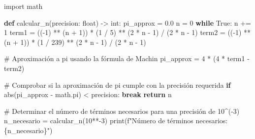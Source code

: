 \documentclass[
  letterpaper,
  DIV=11,
  numbers=noendperiod]{scrartcl}
\newenvironment{Shaded}{\begin{snugshade}}{\end{snugshade}}
\newcommand{\BuiltInTok}[1]{\textcolor[rgb]{0.00,0.23,0.31}{#1}}
\newcommand{\CommentTok}[1]{\textcolor[rgb]{0.37,0.37,0.37}{#1}}
\newcommand{\ControlFlowTok}[1]{\textcolor[rgb]{0.00,0.23,0.31}{\textbf{#1}}}
\newcommand{\DecValTok}[1]{\textcolor[rgb]{0.68,0.00,0.00}{#1}}
\newcommand{\FloatTok}[1]{\textcolor[rgb]{0.68,0.00,0.00}{#1}}
\newcommand{\ImportTok}[1]{\textcolor[rgb]{0.00,0.46,0.62}{#1}}
\newcommand{\KeywordTok}[1]{\textcolor[rgb]{0.00,0.23,0.31}{\textbf{#1}}}
\newcommand{\NormalTok}[1]{\textcolor[rgb]{0.00,0.23,0.31}{#1}}
\newcommand{\OperatorTok}[1]{\textcolor[rgb]{0.37,0.37,0.37}{#1}}
\newcommand{\SpecialCharTok}[1]{\textcolor[rgb]{0.37,0.37,0.37}{#1}}
\newcommand{\SpecialStringTok}[1]{\textcolor[rgb]{0.13,0.47,0.30}{#1}}
\newcommand{\VariableTok}[1]{\textcolor[rgb]{0.07,0.07,0.07}{#1}}
\begin{document}
\begin{Shaded}
\begin{Highlighting}[]
\ImportTok{import}\NormalTok{ math}

\KeywordTok{def}\NormalTok{ calcular\_n(precision: }\BuiltInTok{float}\NormalTok{) }\OperatorTok{{-}\textgreater{}} \BuiltInTok{int}\NormalTok{:}
\NormalTok{    pi\_approx }\OperatorTok{=} \FloatTok{0.0}
\NormalTok{    n }\OperatorTok{=} \DecValTok{0}
    \ControlFlowTok{while} \VariableTok{True}\NormalTok{:}
\NormalTok{        n }\OperatorTok{+=} \DecValTok{1}
\NormalTok{        term1 }\OperatorTok{=}\NormalTok{ ((}\OperatorTok{{-}}\DecValTok{1}\NormalTok{) }\OperatorTok{**}\NormalTok{ (n }\OperatorTok{+} \DecValTok{1}\NormalTok{)) }\OperatorTok{*}\NormalTok{ (}\DecValTok{1} \OperatorTok{/} \DecValTok{5}\NormalTok{) }\OperatorTok{**}\NormalTok{ (}\DecValTok{2} \OperatorTok{*}\NormalTok{ n }\OperatorTok{{-}} \DecValTok{1}\NormalTok{) }\OperatorTok{/}\NormalTok{ (}\DecValTok{2} \OperatorTok{*}\NormalTok{ n }\OperatorTok{{-}} \DecValTok{1}\NormalTok{)}
\NormalTok{        term2 }\OperatorTok{=}\NormalTok{ ((}\OperatorTok{{-}}\DecValTok{1}\NormalTok{) }\OperatorTok{**}\NormalTok{ (n }\OperatorTok{+} \DecValTok{1}\NormalTok{)) }\OperatorTok{*}\NormalTok{ (}\DecValTok{1} \OperatorTok{/} \DecValTok{239}\NormalTok{) }\OperatorTok{**}\NormalTok{ (}\DecValTok{2} \OperatorTok{*}\NormalTok{ n }\OperatorTok{{-}} \DecValTok{1}\NormalTok{) }\OperatorTok{/}\NormalTok{ (}\DecValTok{2} \OperatorTok{*}\NormalTok{ n }\OperatorTok{{-}} \DecValTok{1}\NormalTok{)}
        
        \CommentTok{\# Aproximación a pi usando la fórmula de Machin}
\NormalTok{        pi\_approx }\OperatorTok{=} \DecValTok{4} \OperatorTok{*}\NormalTok{ (}\DecValTok{4} \OperatorTok{*}\NormalTok{ term1 }\OperatorTok{{-}}\NormalTok{ term2)}
        
        \CommentTok{\# Comprobar si la aproximación de pi cumple con la precisión requerida}
        \ControlFlowTok{if} \BuiltInTok{abs}\NormalTok{(pi\_approx }\OperatorTok{{-}}\NormalTok{ math.pi) }\OperatorTok{\textless{}}\NormalTok{ precision:}
            \ControlFlowTok{break}
    \ControlFlowTok{return}\NormalTok{ n}

\CommentTok{\# Determinar el número de términos necesarios para una precisión de 10\^{}({-}3)}
\NormalTok{n\_necesario }\OperatorTok{=}\NormalTok{ calcular\_n(}\DecValTok{10}\OperatorTok{**{-}}\DecValTok{3}\NormalTok{)}
\BuiltInTok{print}\NormalTok{(}\SpecialStringTok{f"Número de términos necesarios: }\SpecialCharTok{\{}\NormalTok{n\_necesario}\SpecialCharTok{\}}\SpecialStringTok{"}\NormalTok{)}
\end{Highlighting}
\end{Shaded}
\end{document}
